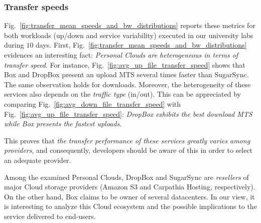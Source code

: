 \subsubsection*{Transfer speeds}
Fig.~\ref{fig:transfer_mean_speeds_and_bw_distributions} 
reports these metrics for both workloads (up/down and service
variability) executed in our university labs during $10$ days.
First, Fig.~\ref{fig:transfer_mean_speeds_and_bw_distributions} 
evidences an interesting fact: \textit{Personal Clouds 
are heterogeneous in terms of transfer speed}.
For instance, Fig.~\ref{fig:avg_up_file_transfer_speed} 
shows that Box and DropBox present an upload MTS 
several times faster than SugarSync. The same observation holds for
downloads. Moreover, the heterogeneity of these services also depends
on the \textit{traffic type} (in/out). This can be appreciated by
comparing Fig.~\ref{fig:avg_down_file_transfer_speed} 
with Fig.~\ref{fig:avg_up_file_transfer_speed}: \textit{DropBox exhibits
the best download MTS while Box presents the fastest 
uploads.}

This proves that \textit{the transfer performance of these services greatly varies among providers}, and
consequently, developers should be aware of this in order to select an adequate provider. 

Among the examined Personal Clouds, DropBox and SugarSync 
are \textit{resellers} of major Cloud storage providers (Amazon S3 
and Carpathia Hosting, respectively). On the other hand, Box claims to be owner of several
datacenters. In our view, it is interesting to analyze this 
Cloud ecosystem and the possible implications to the service delivered to end-users.


